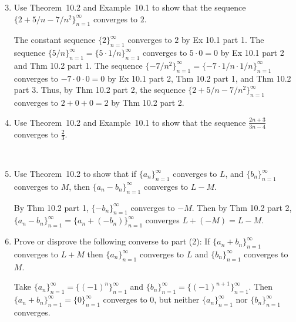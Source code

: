 \documentclass[12pt]{amsart}
\numberwithin{equation}{section}
\theoremstyle{plain} %
\theoremstyle{definition}
\theoremstyle{remark}
\begin{document}
\begin{enumerate}\setcounter{enumi}{2}

\item Use Theorem~10.2 and Example~10.1 to show that the sequence $\{2 + 5/n - 7/n^2\}_{n=1}^\infty$ converges to $2$.

\begin{framed}
The constant sequence $\{2\}_{n=1}^\infty$ converges to $2$ by Ex 10.1 part 1. The sequence $\{5/n\}_{n=1}^\infty = \{5 \cdot 1/n\}_{n=1}^\infty$ converges to $5\cdot 0 = 0$ by Ex 10.1 part 2 and Thm 10.2 part 1. The sequence $\{ -7/n^2\}_{n=1}^\infty = \{ -7 \cdot 1/n \cdot 1/n\}_{n=1}^\infty$ converges to $-7 \cdot 0 \cdot 0 = 0$ by Ex 10.1 part 2, Thm 10.2 part 1, and Thm 10.2 part 3. Thus, by Thm 10.2 part 2, the sequence $\{ 2 + 5/n - 7/n^2\}_{n=1}^\infty$ converges to $2+0+0 = 2$ by Thm 10.2 part 2.
\end{framed}

\item Use Theorem~10.2 and Example~10.1 to show that the sequence $\frac{2n+3}{3n-4}$ converges to $\frac23$.

\

\item Use Theorem~10.2 to show that if $\{a_n\}_{n=1}^\infty$ converges to $L$, and $\{b_n\}_{n=1}^\infty$ converges to $M$, then $\{a_n - b_n\}_{n=1}^\infty$ converges to $L-M$.

\begin{framed}
By Thm 10.2 part 1, $\{-b_n\}_{n=1}^\infty$ converges to $-M$. Then by Thm 10.2 part 2, $\{a_n - b_n\}_{n=1}^\infty = \{a_n + (- b_n)\}_{n=1}^\infty$ converges $L+(-M) = L-M$.
\end{framed}

\item Prove or disprove the following converse to part (2): If $\{ a_n + b_n \}_{n=1}^\infty$ converges to $L+M$ then $\{a_n \}_{n=1}^\infty$ converges to $L$ and $\{ b_n \}_{n=1}^\infty$ converges to $M$.

\begin{framed}
Take $\{ a_n\}_{n=1}^\infty = \{ (-1)^n\}_{n=1}^\infty$ and $\{ b_n \}_{n=1}^\infty = \{ (-1)^{n+1} \}_{n=1}^\infty$. Then $\{ a_n + b_n\}_{n=1}^\infty = \{ 0 \}_{n=1}^\infty$ converges to $0$, but neither $\{a_n\}_{n=1}^\infty$ nor $\{b_n\}_{n=1}^\infty$ converges.
\end{framed}



\end{enumerate}
\end{document}
